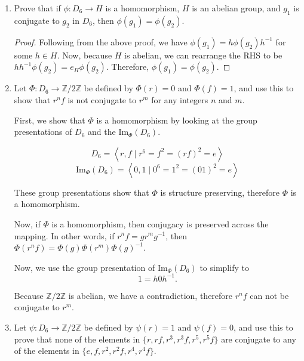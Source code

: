\documentclass{article}
\newcommand{\Z}{\mathbb{Z}}
\newcommand{\ang}[1]{\left\langle #1 \right\rangle}
\newcommand{\inv}{^{-1}}
\begin{document}
\begin{enumerate}
{\begin{proof}
            Since \(\phi(d) \in H\), \(\phi(g_1)\) must be conjugate to \(\phi(g_2)\).
        \end{proof}
    }

    \item {
        Prove that if \(\phi\colon D_6 \to H\) is a homomorphism, \(H\) is an abelian group, and \(g_1\) is conjugate to \(g_2\) in \(D_6\), then \(\phi(g_1) = \phi(g_2)\).

        \begin{proof}
            Following from the above proof, we have \(\phi(g_1) = h \phi(g_2) h\inv\) 
            for some \(h \in H\). Now, because \(H\) is abelian, we can rearrange 
            the RHS to be \(h h\inv \phi(g_2) = e_H \phi(g_2)\). Therefore, 
            \(\phi(g_1) = \phi(g_2)\).
        \end{proof}
    }

    \item {
        Let \(\Phi\colon D_6 \to \mathbb{Z}/2\mathbb{Z}\) be defined by \(\Phi(r) = 0\) and \(\Phi(f) = 1\), and use this to show that \(r^nf\) is not conjugate to \(r^m\) for any integers \(n\) and \(m\).
    
        First, we show that \(\Phi\) is a homomorphism by looking at the group 
        presentations of \(D_6\) and the \(\text{Im}_{\Phi}(D_6)\).

        \[D_6 = \ang{ r, f \mid r^6 = f^2 = (rf)^2 = e}\]
        \[\text{Im}_\Phi (D_6) = \ang{ 0, 1 \mid 0^6 = 1^2 = (01)^2 = e }\]

        These group presentations show that \(\Phi\) is structure preserving, 
        therefore \(\Phi\) is a homomorphism.

        Now, if \(\Phi\) is a homomorphism, then conjugacy is preserved across 
        the mapping. In other words, if \(r^n f = g r^m g\inv\), then 
        \(\Phi(r^n f) = \Phi(g) \Phi(r^m) \Phi(g)\inv\).

        Now, we use the group presentation of \(\text{Im}_\Phi (D_6)\) to simplify to 
        \[ 1 = h 0 h\inv.\]

        Because \(\Z / 2\Z\) is abelian, we have a contradiction, therefore 
        \(r^nf\) can not be conjugate to \(r^m\).
    }

    \item {
        Let \(\psi\colon D_6 \to \mathbb{Z}/2\mathbb{Z}\) be defined by \(\psi(r) = 1\) and \(\psi(f) = 0\), and use this to prove that none of the elements in \(\{r, rf, r^3, r^3f, r^5, r^5f\}\) are conjugate to any of the elements in \(\{e, f, r^2, r^2f, r^4, r^4f\}\).
    
}
\end{enumerate}
\end{document}
